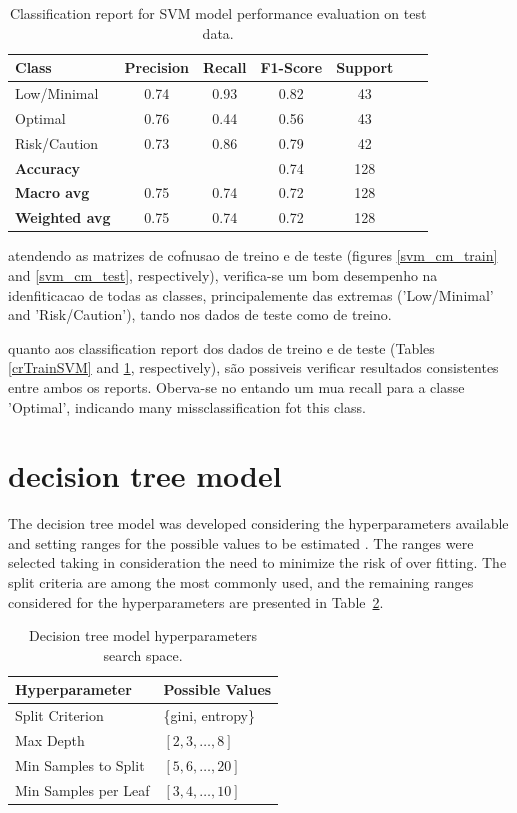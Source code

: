 \documentclass[conference]{IEEEtran}
\begin{document}
\begin{table}[H]
\centering
\caption{Classification report for SVM model performance evaluation on test data.}
\label{crTestSVM}
\begin{tabular}{lcccccc}
\toprule
\textbf{Class} & \textbf{Precision} & \textbf{Recall} & \textbf{F1-Score} & \textbf{Support} \\
\midrule
Low/Minimal & 0.74 & 0.93 & 0.82 & 43 \\
Optimal & 0.76 & 0.44 & 0.56 & 43 \\
Risk/Caution & 0.73 & 0.86 & 0.79 & 42 \\
\midrule
\textbf{Accuracy} &  &  & 0.74 & 128 \\
\textbf{Macro avg} & 0.75 & 0.74 & 0.72 & 128 \\
\textbf{Weighted avg} & 0.75 & 0.74 & 0.72 & 128 \\
\bottomrule
\end{tabular}
\end{table}


atendendo as matrizes de cofnusao de treino e de teste (figures \ref{svm_cm_train} and \ref{svm_cm_test}, respectively), verifica-se um bom desempenho na idenfiticacao de todas as classes, principalemente das extremas ('Low/Minimal' and 'Risk/Caution'), tando nos dados de teste como de treino.

quanto aos classification report dos dados de treino e de teste (Tables \ref{crTrainSVM} and \ref{crTestSVM}, respectively), são possiveis verificar resultados consistentes entre ambos os reports. Oberva-se no entando um mua recall para a classe 'Optimal', indicando many missclassification fot this class.


\section{decision tree model}

The decision tree model was developed considering the hyperparameters available and setting ranges for the possible values to be estimated \cite{dtree17}. The ranges were selected taking in consideration the need to minimize the risk of over fitting. The split criteria are among the most commonly used, and the remaining ranges considered for the hyperparameters are presented in Table~\ref{parametrosDTree}.

\begin{table}[H]
\centering
\caption{Decision tree model hyperparameters search space.}
\label{parametrosDTree}
\begin{tabular}{ll}
\toprule
\textbf{Hyperparameter} & \textbf{Possible Values} \\
\midrule
Split Criterion & \{gini, entropy\} \\ 
Max Depth & $[2, 3, \dots, 8]$ \\ 
Min Samples to Split & $[5, 6, \dots, 20]$ \\ 
Min Samples per Leaf & $[3, 4, \dots, 10]$ \\
\bottomrule
\end{tabular}
\end{table}
\end{document}
